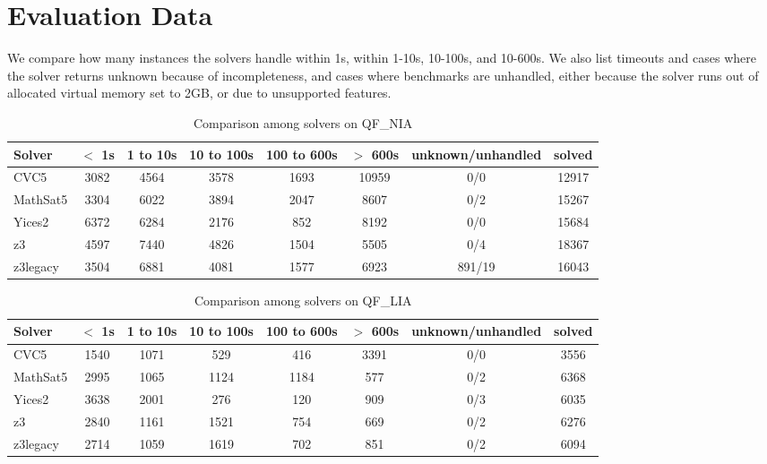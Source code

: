 \section{Evaluation Data}
\label{app:eval}

We compare how many instances the solvers handle within
1s, within 1-10s, 10-100s, and 10-600s. We also list
timeouts and cases where the solver returns unknown because of incompleteness,
and cases where benchmarks are unhandled, either because the solver runs out of allocated virtual memory set to 2GB,
or due to unsupported features.


\begin{table}
  \begin{tabular}{|l|c|c|c|c|c|c|c|}
    \hline
    Solver & $<$ 1s & 1 to 10s & 10 to 100s & 100 to 600s & $>$ 600s & unknown/unhandled & solved \\
    \hline
    CVC5 & 3082 & 4564 & 3578 & 1693 & 10959 & 0/0 & 12917 \\
    \hline
    MathSat5 & 3304 & 6022 & 3894 & 2047 & 8607 & 0/2 & 15267 \\
    \hline
    Yices2 & 6372 & 6284 & 2176 & 852 & 8192 & 0/0 & 15684 \\
    \hline
    z3 & 4597 & 7440 & 4826 & 1504 & 5505 & 0/4 & 18367 \\
    \hline
    z3legacy & 3504 & 6881 & 4081 & 1577 & 6923 & 891/19 & 16043 \\
    \hline
    \end{tabular}
  \caption{Comparison among solvers on QF\_NIA \label{tab:compare-qf-nia}}
\end{table}


\begin{table}
  \begin{tabular}{|l|c|c|c|c|c|c|c|}
    \hline
    Solver & $<$ 1s & 1 to 10s & 10 to 100s & 100 to 600s & $>$ 600s & unknown/unhandled & solved \\
    \hline
    CVC5 & 1540 & 1071 & 529 & 416 & 3391 & 0/0 & 3556 \\
    \hline
    MathSat5 & 2995 & 1065 & 1124 & 1184 & 577 & 0/2 & 6368 \\
    \hline
    Yices2 & 3638 & 2001 & 276 & 120 & 909 & 0/3 & 6035 \\
    \hline
    z3 & 2840 & 1161 & 1521 & 754 & 669 & 0/2 & 6276 \\
    \hline
    z3legacy & 2714 & 1059 & 1619 & 702 & 851 & 0/2 & 6094 \\
    \hline
    \end{tabular}
  \caption{Comparison among solvers on QF\_LIA \label{tab:compare-qf-lia}}
\end{table}



